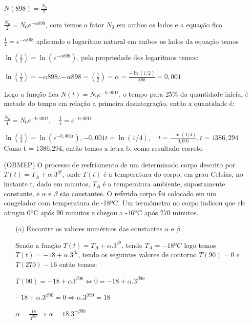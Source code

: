 \begin{multicols*}{2}
    $N(898) = \frac{N_0}{2}$

    $\frac{N_0}{2} = N_0 e^{- \alpha 898}$, com temos o fator $N_0$ em ambos os lados e a equação 			fica

    $\frac{1}{2} = e^{- \alpha 898}$ aplicando o logarítmo natural em ambos os lados da equação 			temos

    $\ln \left(\frac{1}{2} \right) = \ln \left( e^{- \alpha 898} \right)$, pela propriedade dos 			logarítmos temos:

    $\ln \left(\frac{1}{2} \right) =  - \alpha 898  \therefore
        - \alpha 898 =  \left(\frac{1}{2} \right) = \alpha = \frac{-\ln(1/2)}{898} = 0,001$

    Logo a função fica $N(t) = N_0 e^{-0,001t}$, o tempo para 25\% da quantidade inicial é metade 			do tempo em relação a primeira desintegração, então a quantidade é:



    $\frac{N_0}{4} = N_0 e^{-0,001 t}, \quad \frac{1}{4} = e^{-0,001t}$

    $\ln \left( \frac{1}{4} \right) = \ln \left( e^{-0,001t} \right),
        -0,001t = \ln( 1/4), \quad t = \frac{ - \ln( 1/4)}{ 0,001}, t = 1386,294
    $
    Como t = 1386,294, então temos a letra b, como resultado correto


    \execnum (OBMEP) O processo de resfriamento de um determinado corpo descrito por
    $T(t) = T_A + \alpha.3^{\beta t}$, onde $T(t)$ é a temperatura do corpo, em grau Celsius, no 			instante t, dado em minutos, $T_A$ é a temperatura ambiente, supostamente constante, e $\alpha$
    e $\beta$ são constantes. O referido corpo foi colocado em um congelador com temperatura de 			-18ºC. Um termômetro no corpo indicou que ele atingiu 0ºC após 90 minutos e chegou a 					-16ºC após 270 minutos.
    \begin{itemize}
        \item[(a)] Encontre os valores numéricos das constantes $\alpha$ e $\beta$

            Sendo a função $T(t) = T_A + \alpha.3^{\beta t}$, tendo $T_A = -18ºC$ logo temos
            $T(t) = -18 + \alpha.3^{\beta t}$, tendo os seguintes valores de contorno $T(90) = 0$ e
            $T(270) -16$ então temos:

            $T(90) = -18 + \alpha 3^{\beta 90} \Leftrightarrow 0 = -18 + \alpha .3^{\beta 90}$

            $-18 + \alpha .3^{\beta 90} = 0 \Rightarrow \alpha.3^{\beta 90} = 18$

            $\alpha = \frac{18}{3^{\beta 90}} \Rightarrow \alpha = 18.3^{ - \beta 90}$


\end{itemize}
\end{multicols*}
